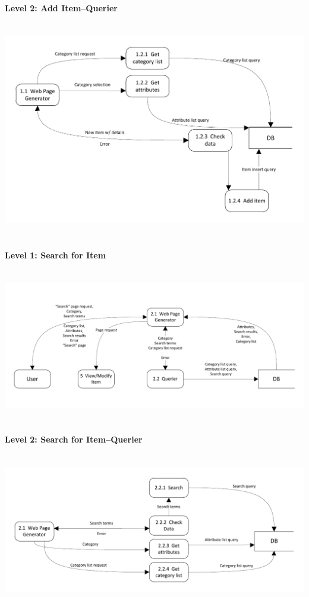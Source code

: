 \documentclass{article}
\begin{document}
\paragraph{Level 2: Add Item--Querier}
~\\
\includegraphics[keepaspectratio, width=6.5in]{dfd_level2_add_item_querier.pdf}\\
~\\

\paragraph{Level 1: Search for Item}
~\\
\includegraphics[keepaspectratio, width=6.5in]{dfd_level1_search_for_item.pdf}\\
~\\

\paragraph{Level 2: Search for Item--Querier}
~\\
\includegraphics[keepaspectratio, width=6.5in]{dfd_level2_search_for_item_querier.pdf}\\
~\\
\end{document}
